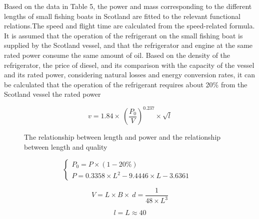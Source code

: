 \documentclass{mcmthesis}
\begin{document}
Based on the data in Table 5, the power and mass corresponding to the different lengths of small fishing boats in Scotland are fitted to the relevant functional relations.The speed and flight time are calculated from the speed-related formula.
It is assumed that the operation of the refrigerant on the small fishing boat is supplied by the Scotland vessel, and that the refrigerator and engine at the same rated power consume the same amount of oil. Based on the density of the refrigerator, the price of diesel, and its comparison with the capacity of the vessel and its rated power, considering natural losses and energy conversion rates, it can be calculated that the operation of the refrigerant requires about 20\%  from the Scotland vessel the rated power

\begin{equation}\label{1}
v=1.84\times \ (\frac{P_0}{V}) ^{0.237} \times \sqrt{l}
\end{equation}

\begin{figure}[tbp]
  \caption{The relationship between length and power and the relationship between length and quality }\label{figure1}
\end{figure}

\begin{equation}
\left\{
\begin{array}{lr}
P_0=P \times (1-20\%) &\\
P= 0.3358\times L^2 -9.4446\times L - 3.6361

\end{array}
\right.
\end{equation}



\begin{equation}\label{3}
V=L\times B\times\ d =\frac{1}{48\times L^3}
\end{equation}

\begin{equation}\label{4}
l=L\approx 40
\end{equation}
\end{document}
